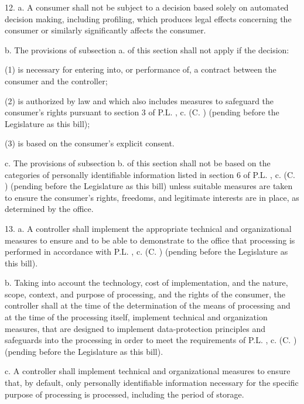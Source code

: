  

     12.  a.  A consumer shall not be subject to a decision based solely on automated decision making, including profiling, which produces legal effects concerning the consumer or similarly significantly affects the consumer.

     b.    The provisions of subsection a. of this section shall not apply if the decision:

     (1)   is necessary for entering into, or performance of, a contract between the consumer and the controller;

     (2)   is authorized by law and which also includes measures to safeguard the consumer's rights pursuant to section 3 of P.L.    , c.    (C.      ) (pending before the Legislature as this bill);

     (3)   is based on the consumer's explicit consent.

     c.     The provisions of subsection b. of this section shall not be based on the categories of personally identifiable information listed in section 6 of P.L.    , c.    (C.      ) (pending before the Legislature as this bill) unless suitable measures are taken to ensure the consumer's rights, freedoms, and legitimate interests are in place, as determined by the office.

 

     13.  a.  A controller shall implement the appropriate technical and organizational measures to ensure and to be able to demonstrate to the office that processing is performed in accordance with P.L.    , c.    (C.      ) (pending before the Legislature as this bill).

     b.    Taking into account the technology, cost of implementation, and the nature, scope, context, and purpose of processing, and the rights of the consumer, the controller shall at the time of the determination of the means of processing and at the time of the processing itself, implement technical and organization measures, that are designed to implement data-protection principles and safeguards into the processing in order to meet the requirements of P.L.    , c.    (C.      ) (pending before the Legislature as this bill).

     c.     A controller shall implement technical and organizational measures to ensure that, by default, only personally identifiable information necessary for the specific purpose of processing is processed, including the period of storage.

 

